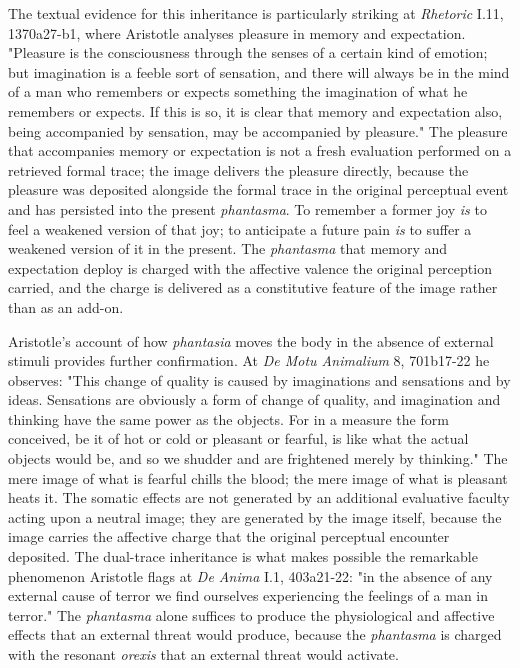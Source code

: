 \documentclass[12pt]{article}
\begin{document}
The textual evidence for this inheritance is particularly striking at \textit{Rhetoric} I.11, 1370a27-b1, where Aristotle analyses pleasure in memory and expectation. "Pleasure is the consciousness through the senses of a certain kind of emotion; but imagination is a feeble sort of sensation, and there will always be in the mind of a man who remembers or expects something the imagination of what he remembers or expects. If this is so, it is clear that memory and expectation also, being accompanied by sensation, may be accompanied by pleasure." The pleasure that accompanies memory or expectation is not a fresh evaluation performed on a retrieved formal trace; the image delivers the pleasure directly, because the pleasure was deposited alongside the formal trace in the original perceptual event and has persisted into the present \textit{phantasma}. To remember a former joy \textit{is} to feel a weakened version of that joy; to anticipate a future pain \textit{is} to suffer a weakened version of it in the present. The \textit{phantasma} that memory and expectation deploy is charged with the affective valence the original perception carried, and the charge is delivered as a constitutive feature of the image rather than as an add-on.

Aristotle's account of how \textit{phantasia} moves the body in the absence of external stimuli provides further confirmation. At \textit{De Motu Animalium} 8, 701b17-22 he observes: "This change of quality is caused by imaginations and sensations and by ideas. Sensations are obviously a form of change of quality, and imagination and thinking have the same power as the objects. For in a measure the form conceived, be it of hot or cold or pleasant or fearful, is like what the actual objects would be, and so we shudder and are frightened merely by thinking." The mere image of what is fearful chills the blood; the mere image of what is pleasant heats it. The somatic effects are not generated by an additional evaluative faculty acting upon a neutral image; they are generated by the image itself, because the image carries the affective charge that the original perceptual encounter deposited. The dual-trace inheritance is what makes possible the remarkable phenomenon Aristotle flags at \textit{De Anima} I.1, 403a21-22: "in the absence of any external cause of terror we find ourselves experiencing the feelings of a man in terror." The \textit{phantasma} alone suffices to produce the physiological and affective effects that an external threat would produce, because the \textit{phantasma} is charged with the resonant \textit{orexis} that an external threat would activate.
\end{document}
